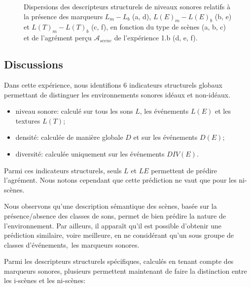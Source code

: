 \begin{figure}[t]
       \caption{Dispersions des descripteurs structurels de niveaux sonores relatifs à la présence des marqueurs $L_m-L_b$ (a, d), $L(E)_m-L(E)_b$ (b, e) et $L(T)_m-L(T)_b$ (c, f), en fonction du type de scènes (a, b, c) et de l'agrément perçu $\mathcal{A}_{scene}$ de l'expérience 1.b (d, e, f).}\label{fig:soundlevelMarkerDiff}
\end{figure}

\subsection{Discussions}

Dans cette expérience, nous identifions 6 indicateurs structurels globaux permettant de distinguer les environnements sonores idéaux et non-idéaux.

\begin{itemize}
\item niveau sonore: calculé sur tous les sons $L$, les événements $L(E)$ et les textures $L(T)$; 
\item densité: calculée de manière globale $D$ et sur les événements $D(E)$;
\item diversité: calculée uniquement sur les événements $DIV(E)$.
\end{itemize}

Parmi ces indicateurs structurels, seuls $L$ et $LE$ permettent de prédire l'agrément. Nous notons cependant que cette prédiction ne vaut que pour les ni-scènes. 

Nous observons qu'une description sémantique des scènes, basée sur la présence/absence des classes de sons, permet de bien prédire la nature de l'environnement. Par ailleurs, il apparaît qu'il est possible d'obtenir une prédiction similaire, voire meilleure, en ne considérant qu'un sous groupe de classes d'événements,\ie~les marqueurs sonores.

Parmi les descripteurs structurels spécifiques, calculés en tenant compte des marqueurs sonores, plusieurs permettent maintenant de faire la distinction entre les i-scènes et les ni-scènes:


